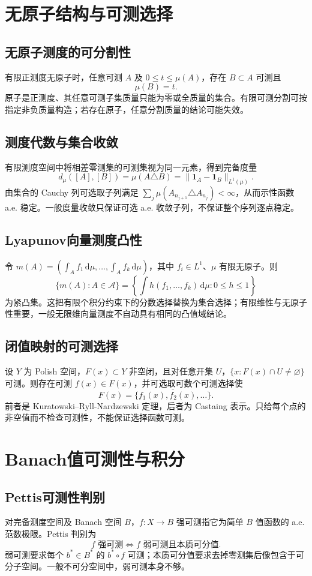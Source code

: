 \documentclass[../main.tex]{subfiles}
\begin{document}
\section{无原子结构与可测选择}
\subsection{无原子测度的可分割性}
有限正测度无原子时，任意可测 $A$ 及 $0\le t\le\mu(A)$，存在 $B\subset A$ 可测且
\[
\mu(B)=t.
\]
原子是正测度、其任意可测子集质量只能为零或全质量的集合。有限可测分割可按指定非负质量构造；若存在原子，任意分割质量的结论可能失效。
\subsection{测度代数与集合收敛}
有限测度空间中将相差零测集的可测集视为同一元素，得到完备度量
\[
d_\mu([A],[B])=\mu(A\triangle B)
=\|\bm1_A-\bm1_B\|_{L^1(\mu)}.
\]
由集合的 Cauchy 列可选取子列满足 $\sum_j\mu(A_{n_{j+1}}\triangle A_{n_j})<\infty$，从而示性函数 a.e. 稳定。一般度量收敛只保证可选 a.e. 收敛子列，不保证整个序列逐点稳定。
\subsection{Lyapunov向量测度凸性}
令 $m(A)=(\int_Af_1\,\mathrm d\mu,\ldots,\int_Af_k\,\mathrm d\mu)$，其中 $f_i\in L^1$、$\mu$ 有限无原子。则
\[
\{m(A):A\in\mathcal A\}
=\left\{\int h(f_1,\ldots,f_k)\,\mathrm d\mu:0\le h\le1\right\}
\]
为紧凸集。这把有限个积分约束下的分数选择替换为集合选择；有限维性与无原子性重要，一般无限维向量测度不自动具有相同的凸值域结论。
\subsection{闭值映射的可测选择}
设 $Y$ 为 Polish 空间，$F(x)\subset Y$ 非空闭，且对任意开集 $U$，$\{x:F(x)\cap U\ne\varnothing\}$ 可测。则存在可测 $f(x)\in F(x)$，并可选取可数个可测选择使
\[
F(x)=\overline{\{f_1(x),f_2(x),\ldots\}}.
\]
前者是 Kuratowski--Ryll-Nardzewski 定理，后者为 Castaing 表示。只给每个点的非空值而不检查可测性，不能保证选择函数可测。
\section{Banach值可测性与积分}\label{sec:measure-vector}
\subsection{Pettis可测性判别}
对完备测度空间及 Banach 空间 $B$，$f:X\to B$ 强可测指它为简单 $B$ 值函数的 a.e. 范数极限。Pettis 判别为
\[
f\text{ 强可测}\iff f\text{ 弱可测且本质可分值}.
\]
弱可测要求每个 $b^*\in B^*$ 的 $b^*\circ f$ 可测；本质可分值要求去掉零测集后像包含于可分子空间。一般不可分空间中，弱可测本身不够。
\end{document}
